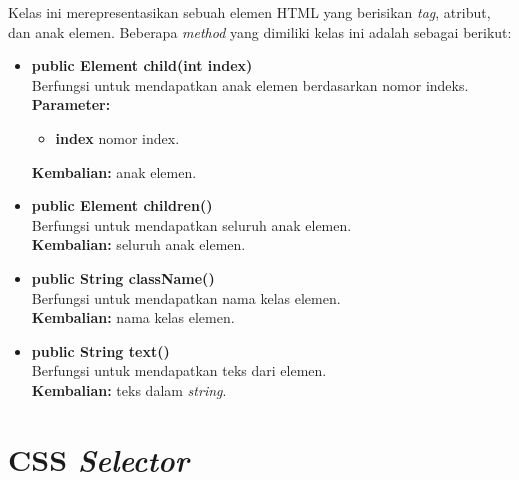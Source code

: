 Kelas ini merepresentasikan sebuah elemen HTML yang berisikan \textit{tag}, atribut, dan anak elemen. Beberapa \textit{method} yang dimiliki kelas ini adalah sebagai berikut:
\begin{itemize}
	\item \textbf{public Element child(int index)} \\
		Berfungsi untuk mendapatkan anak elemen berdasarkan nomor indeks. \\
		\textbf{Parameter:} 
		\begin{itemize}
			\item \textbf{index} nomor index.
		\end{itemize}
		\textbf{Kembalian:} anak elemen.	
		
		\item \textbf{public Element children()} \\
		Berfungsi untuk mendapatkan seluruh anak elemen. \\
		\textbf{Kembalian:} seluruh anak elemen.	
		
		\item \textbf{public String className()} \\
		Berfungsi untuk mendapatkan nama kelas elemen. \\
		\textbf{Kembalian:} nama kelas elemen.	
		
		\item \textbf{public String text()} \\
		Berfungsi untuk mendapatkan teks dari elemen. \\
		\textbf{Kembalian:} teks dalam \textit{string}.	
\end{itemize}

\section{CSS \textit{Selector}}
\label{sec:selector}

